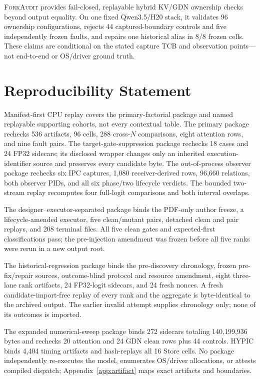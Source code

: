 \documentclass{article}
\newcommand{\method}{\textsc{ForkAudit}}
\begin{document}
\method{} provides fail-closed, replayable hybrid KV/GDN ownership checks
beyond output equality.  On one fixed Qwen3.5/H20 stack, it validates 96
ownership configurations, rejects 44 captured-boundary controls and five
independently frozen faults, and repairs one historical alias in 8/8 frozen
cells.  These claims are conditional on the stated capture TCB and observation
points---not end-to-end or OS/driver ground truth.




\appendix

\section{Reproducibility Statement}
\label{app:reproducibility}

Manifest-first CPU replay covers the primary-factorial package and named
replayable supporting cohorts, not every contextual table.  The primary package
rechecks 536 artifacts, 96 cells, 288 cross-$N$ comparisons, eight attention
rows, and nine fault pairs.  The target-gate-suppression package rechecks 18
cases and 24 FP32 sidecars; its disclosed wrapper changes only an inherited
execution-identifier source and preserves every candidate byte.  The
out-of-process observer package rechecks six IPC captures, 1,080
receiver-derived rows, 96,660 relations, both observer PIDs, and all six
phase/two lifecycle verdicts.  The bounded two-stream replay recomputes four
full-logit comparisons and both interval overlaps.

The designer--executor-separated package binds the PDF-only author freeze, a
lifecycle-amended executor, five clean/mutant pairs, detached clean and pair
replays, and 208 terminal files.  All five clean gates and expected-first
classifications pass; the pre-injection amendment was frozen before all five
ranks were rerun in a new output root.

The historical-regression package binds the pre-discovery chronology, frozen
pre-fix/repair sources, outcome-blind protocol and resource amendment, eight
three-lane rank artifacts, 24 FP32-logit sidecars, and 24 fresh nonces.  A fresh
candidate-import-free replay of every rank and the aggregate is byte-identical
to the archived output.  The earlier invalid attempt supplies chronology only;
none of its outcomes is imported.

The expanded numerical-sweep package binds 272 sidecars totaling 140,199,936
bytes and rechecks 20 attention and 24 GDN clean rows plus 44 controls.  HYPIC
binds 4,404 timing artifacts and
hash-replays all 16 Store cells.  No package independently re-executes the
model, enumerates OS/driver allocations, or attests compiled dispatch;
Appendix~\ref{app:artifact} maps exact artifacts and boundaries.
\end{document}
